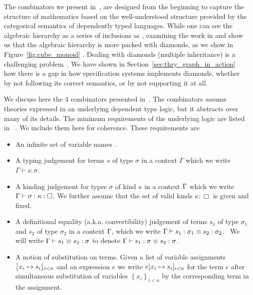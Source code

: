 The combinators we present in~\cite{carette2018building}, are designed from the beginning to capture the structure of mathematics based on the well-understood structure provided by the categorical semantics of dependently typed languages. While one can see the algebraic hierarchy as a series of inclusions as , examining the work in \cite{halleck} and \cite{jipsen} show us that the algebraic hierarchy is more packed with diamonds, as we show in Figure~\ref{fig:cube_monoid} 
.
Dealing with diamonds (multiple inheritance) is a challenging problem~\cite{sakkinen1989disciplined, jigsaw1992, traits2006, diamonds2011}. We have shown in Section~\ref{sec:thry_graph_in_action} how there is a gap in how specification systems implements diamonds, whether by not following its correct semantics, or by not supporting it at all. 

We discuss here the $4$ combinators presented in~\cite{CaretteOConnorTPC, carette2018building}. The combinators assume theories expressed in an underlying dependent type logic, but it abstracts over many of its details. The minimum requirements of the underlying logic are listed in ~\cite{carette2018building}. We include them here for coherence. These requirements are 
\begin{itemize}
    \item An infinite set of variable names \vars.
    
    \item A typing judgement for terms $s$ of type $\sigma$ in a context
    $\Gamma$ which we write $\Gamma \vdash s : \sigma$.
    
    \item A kinding judgement for types $\sigma$ of kind $\kappa$ in a context
    $\Gamma$ which we write\\
    $\Gamma \vdash \sigma : \kappa : \Box$.  We further assume that the set
    of valid kinds $\kappa : \Box$ is given and fixed.
    
    \item A definitional equality (a.k.a. convertibility) judgement of terms
    $s_1$ of type $\sigma_1$ and $s_2$ of type $\sigma_2$ in a context $\Gamma$,
    which we write $\Gamma \vdash s_1 : \sigma_1 \equiv s_2 : \sigma_2$. \ We
    will write $\Gamma \vdash s_1 \equiv s_2 : \sigma$ to denote $\Gamma \vdash
    s_1 : \sigma \equiv s_2 : \sigma$.
    
    \item A notion of substitution on terms. Given a list of variable
    assignments $\lbag x_i \mapsto s_i \rbag_{i < n}$
    and an expression $e$ we write $e[ x_i \mapsto s_i ]_{i < n}$
    for the term $e$ after simultaneous substitution of variables $\left\{ x_i
    \right\}_{i < n}$ by the corresponding term in the assignment.
\end{itemize}


